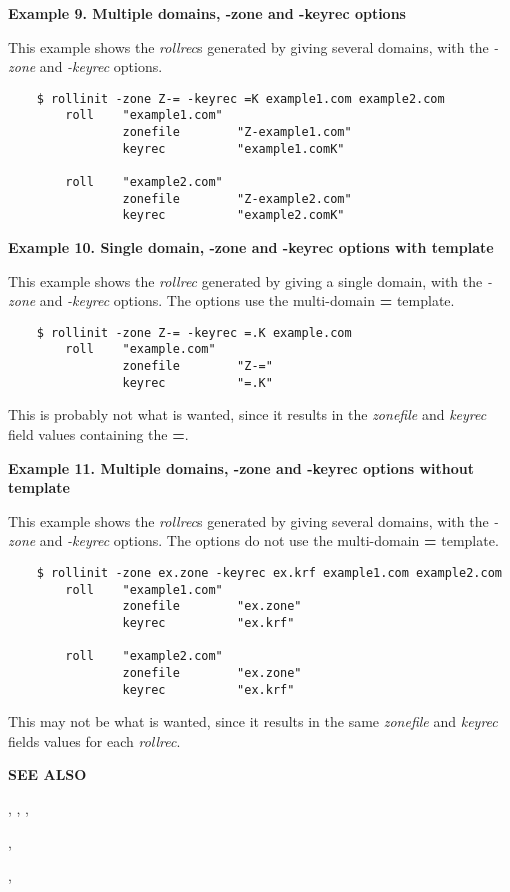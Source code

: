{\bf Example 9.  Multiple domains, -zone and -keyrec options}

This example shows the {\it rollrec}s generated by giving 
several domains, with the {\it -zone} and {\it -keyrec} options.

\begin{verbatim}
    $ rollinit -zone Z-= -keyrec =K example1.com example2.com
        roll    "example1.com"
                zonefile        "Z-example1.com"
                keyrec          "example1.comK"

        roll    "example2.com"
                zonefile        "Z-example2.com"
                keyrec          "example2.comK"
\end{verbatim}

{\bf Example 10.  Single domain, -zone and -keyrec options with template}

This example shows the {\it rollrec} generated by giving  a
single domain, with the {\it -zone} and {\it -keyrec} options.  The options
use the multi-domain {\bf =} template.

\begin{verbatim}
    $ rollinit -zone Z-= -keyrec =.K example.com
        roll    "example.com"
                zonefile        "Z-="
                keyrec          "=.K"
\end{verbatim}

This is probably not what is wanted, since it results in the {\it zonefile}
and {\it keyrec} field values containing the {\bf =}.

{\bf Example 11.  Multiple domains, -zone and -keyrec options without template}

This example shows the {\it rollrec}s generated by giving 
several domains, with the {\it -zone} and {\it -keyrec} options.  The options
do not use the multi-domain {\bf =} template.

\begin{verbatim}
    $ rollinit -zone ex.zone -keyrec ex.krf example1.com example2.com
        roll    "example1.com"
                zonefile        "ex.zone"
                keyrec          "ex.krf"

        roll    "example2.com"
                zonefile        "ex.zone"
                keyrec          "ex.krf"
\end{verbatim}

This may not be what is wanted, since it results in the same {\it zonefile}
and {\it keyrec} fields values for each {\it rollrec}.

{\bf SEE ALSO}

,
,
,

,

,
